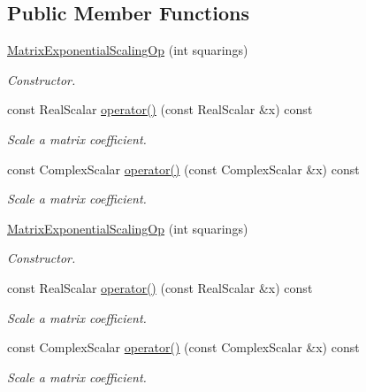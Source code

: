 \subsection*{Public Member Functions}
\begin{DoxyCompactItemize}
\item 
\hyperlink{struct_eigen_1_1internal_1_1_matrix_exponential_scaling_op_afb0f3ee7d324e315d1e1233f70110438}{Matrix\+Exponential\+Scaling\+Op} (int squarings)
\begin{DoxyCompactList}\small\item\em Constructor. \end{DoxyCompactList}\item 
const Real\+Scalar \hyperlink{struct_eigen_1_1internal_1_1_matrix_exponential_scaling_op_ad4c95fe9fcbf59981c2a5a0a4e42041d}{operator()} (const Real\+Scalar \&x) const
\begin{DoxyCompactList}\small\item\em Scale a matrix coefficient. \end{DoxyCompactList}\item 
const Complex\+Scalar \hyperlink{struct_eigen_1_1internal_1_1_matrix_exponential_scaling_op_a7c0d08f36bf3d6f8f6db34b3d3eb2b40}{operator()} (const Complex\+Scalar \&x) const
\begin{DoxyCompactList}\small\item\em Scale a matrix coefficient. \end{DoxyCompactList}\item 
\hyperlink{struct_eigen_1_1internal_1_1_matrix_exponential_scaling_op_afb0f3ee7d324e315d1e1233f70110438}{Matrix\+Exponential\+Scaling\+Op} (int squarings)
\begin{DoxyCompactList}\small\item\em Constructor. \end{DoxyCompactList}\item 
const Real\+Scalar \hyperlink{struct_eigen_1_1internal_1_1_matrix_exponential_scaling_op_ad4c95fe9fcbf59981c2a5a0a4e42041d}{operator()} (const Real\+Scalar \&x) const
\begin{DoxyCompactList}\small\item\em Scale a matrix coefficient. \end{DoxyCompactList}\item 
const Complex\+Scalar \hyperlink{struct_eigen_1_1internal_1_1_matrix_exponential_scaling_op_a7c0d08f36bf3d6f8f6db34b3d3eb2b40}{operator()} (const Complex\+Scalar \&x) const
\begin{DoxyCompactList}\small\item\em Scale a matrix coefficient. \end{DoxyCompactList}\end{DoxyCompactItemize}


